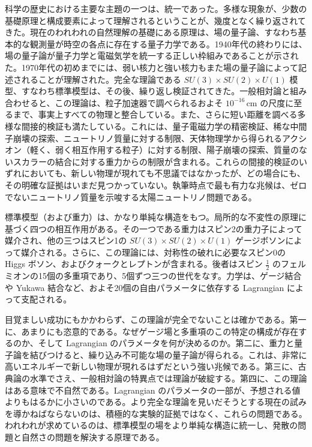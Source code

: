 \label{ch:1}
\label{sec:1.1}

科学の歴史における主要な主題の一つは、統一であった。多様な現象が、少数の基礎原理と構成要素によって理解されるということが、幾度となく繰り返されてきた。現在のわれわれの自然理解の基礎にある原理は、場の量子論、すなわち基本的な観測量が時空の各点に存在する量子力学である。1940年代の終わりには、場の量子論が量子力学と電磁気学を統一する正しい枠組みであることが示された。1970年代の初めまでには、弱い核力と強い核力もまた場の量子論によって記述されることが理解された。完全な理論である $SU(3)\times SU(2)\times U(1)$ 模型、すなわち標準模型は、その後、繰り返し検証されてきた。一般相対論と組み合わせると、この理論は、粒子加速器で調べられるおよそ $10^{-16}\,\mathrm{cm}$ の尺度に至るまで、事実上すべての物理と整合している。また、さらに短い距離を調べる多様な間接的検証も満たしている。これには、量子電磁力学の精密検証、稀な中間子崩壊の探索、ニュートリノ質量に対する制限、天体物理学から得られるアクシオン（軽く、弱く相互作用する粒子）に対する制限、陽子崩壊の探索、質量のないスカラーの結合に対する重力からの制限が含まれる。これらの間接的検証のいずれにおいても、新しい物理が現れても不思議ではなかったが、どの場合にも、その明確な証拠はいまだ見つかっていない。執筆時点で最も有力な兆候は、ゼロでないニュートリノ質量を示唆する太陽ニュートリノ問題である。

標準模型（および重力）は、かなり単純な構造をもつ。局所的な不変性の原理に基づく四つの相互作用がある。その一つである重力はスピン2の重力子によって媒介され、他の三つはスピン1の $SU(3)\times SU(2)\times U(1)$ ゲージボソンによって媒介される。さらに、この理論には、対称性の破れに必要なスピン0の Higgs ボソン、およびクォークとレプトンが含まれる。後者はスピン $\tfrac12$ のフェルミオンの15個の多重項であり、5個ずつ三つの世代をなす。力学は、ゲージ結合や Yukawa 結合など、およそ20個の自由パラメータに依存する Lagrangian によって支配される。

目覚ましい成功にもかかわらず、この理論が完全でないことは確かである。第一に、あまりにも恣意的である。なぜゲージ場と多重項のこの特定の構成が存在するのか、そして Lagrangian のパラメータを何が決めるのか。第二に、重力と量子論を結びつけると、繰り込み不可能な場の量子論が得られる。これは、非常に高いエネルギーで新しい物理が現れるはずだという強い兆候である。第三に、古典論の水準でさえ、一般相対論の特異点では理論が破綻する。第四に、この理論はある意味で不自然である。Lagrangian のパラメータの一部が、予想される値よりもはるかに小さいのである。より完全な理論を見いだそうとする現在の試みを導かねばならないのは、積極的な実験的証拠ではなく、これらの問題である。われわれが求めているのは、標準模型の場をより単純な構造に統一し、発散の問題と自然さの問題を解決する原理である。

